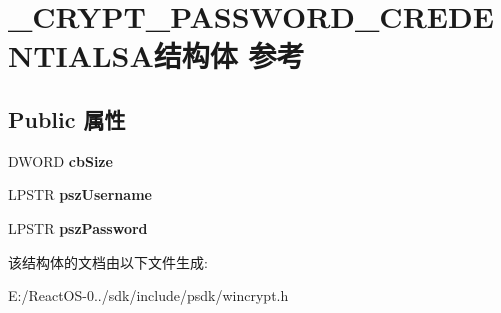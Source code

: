 \hypertarget{struct___c_r_y_p_t___p_a_s_s_w_o_r_d___c_r_e_d_e_n_t_i_a_l_s_a}{}\section{\+\_\+\+C\+R\+Y\+P\+T\+\_\+\+P\+A\+S\+S\+W\+O\+R\+D\+\_\+\+C\+R\+E\+D\+E\+N\+T\+I\+A\+L\+S\+A结构体 参考}
\label{struct___c_r_y_p_t___p_a_s_s_w_o_r_d___c_r_e_d_e_n_t_i_a_l_s_a}
\subsection*{Public 属性}
\begin{DoxyCompactItemize}
\item 
\mbox{\label{struct___c_r_y_p_t___p_a_s_s_w_o_r_d___c_r_e_d_e_n_t_i_a_l_s_a_a91cd9834ca5d1e831a0dde64dab6f444}} 
D\+W\+O\+RD {\bfseries cb\+Size}
\item 
\mbox{\label{struct___c_r_y_p_t___p_a_s_s_w_o_r_d___c_r_e_d_e_n_t_i_a_l_s_a_a8ce6dc756f5920e1bef011e551bc6606}} 
L\+P\+S\+TR {\bfseries psz\+Username}
\item 
\mbox{\label{struct___c_r_y_p_t___p_a_s_s_w_o_r_d___c_r_e_d_e_n_t_i_a_l_s_a_a5b6c642285f5884dbc9fa60702652e82}} 
L\+P\+S\+TR {\bfseries psz\+Password}
\end{DoxyCompactItemize}


该结构体的文档由以下文件生成\+:\begin{DoxyCompactItemize}
\item 
E\+:/\+React\+O\+S-\/0../sdk/include/psdk/wincrypt.\+h\end{DoxyCompactItemize}
